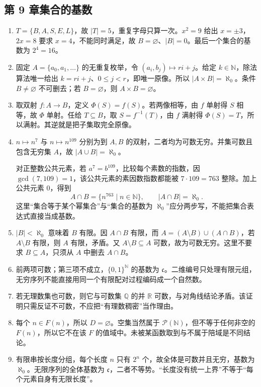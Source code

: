 \documentclass[UTF8,fontset=none,zihao=-4,a4paper]{ctexart}
\begin{document}
\subsection*{第 9 章\quad 集合的基数}
\begin{enumerate}[label=9.\arabic*.,leftmargin=2.8em]
\item $T=\{B,A,S,E,L\}$，故 $|T|=5$，重复字母只算一次。$x^2=9$ 给出 $x=\pm3$，$2x=8$ 要求 $x=4$，不能同时满足，故 $B=\varnothing$、$|B|=0$。最后一个集合的基数为 $2^4=16$。

\item 固定 $A=\{a_0,a_1,\ldots\}$ 的无重复枚举，令 $(a_i,b_j)\mapsto ri+j$。给定 $k\in\mathbb N$，除法算法唯一给出 $k=ri+j$、$0\le j<r$，即唯一原像。所以 $|A\times B|=\aleph_0$。条件 $B\ne\varnothing$ 不可删去；若 $B=\varnothing$，则 $A\times B=\varnothing$。

\item 取双射 $f:A\to B$，定义 $\Phi(S)=f(S)$。若两像相等，由 $f$ 单射得 $S$ 相等，故 $\Phi$ 单射。任给 $T\subseteq B$，取 $S=f^{-1}(T)$，由 $f$ 满射得 $\Phi(S)=T$，所以满射。其逆就是把子集取完全原像。

\item $n\mapsto n^7$ 与 $n\mapsto n^{109}$ 分别为到 $A,B$ 的双射，二者均为可数无穷。并集可数且包含无穷集 $A$，故 $|A\cup B|=\aleph_0$。

对正整数公共元素，若 $a^7=b^{109}$，比较每个素数的指数，因 $\gcd(7,109)=1$，该公共元素的素因数指数都能被 $7\cdot109=763$ 整除。加上公共元素 $0$，得到
\[
A\cap B=\{n^{763}\mid n\in\mathbb N\},\qquad |A\cap B|=\aleph_0.
\]
这里“集合等于某个幂集合”与“集合的基数为 $\aleph_0$”应分两步写，不能把集合表达式直接当成基数。

\item $|B|<\aleph_0$ 意味着 $B$ 有限。因 $A\cap B$ 有限，而 $A=(A\setminus B)\cup(A\cap B)$，若 $A\setminus B$ 有限，则 $A$ 有限，矛盾。又 $A\setminus B\subseteq A$ 可数，故为可数无穷。这里不要求 $B\subseteq A$，只须从 $A$ 中删去 $A\cap B$。

\item 前两项可数；第三项不成立，$\{0,1\}^{\mathbb N}$ 的基数为 $\mathfrak c$。二维编号只处理有限元组，无穷序列不能直接用同一个有限配对过程编码成一个自然数。

\item 若无理数集也可数，则它与可数集 $\mathbb Q$ 的并 $\mathbb R$ 可数，与对角线结论矛盾。该证明只需反证不可数，不应把“有理数稠密”当作理由。

\item 每个 $n\in F(n)$，所以 $D=\varnothing$。空集当然属于 $\mathcal P(\mathbb N)$，但不等于任何非空的 $F(n)$，所以它不在该 $F$ 的值域中。未被某函数取到与不属于陪域是不同结论。

\item 有限串按长度分组，每个长度 $n$ 只有 $2^n$ 个，故全体是可数并且无穷，基数为 $\aleph_0$。无限序列的全体基数为 $\mathfrak c$，二者不等势。“长度没有统一上界”不等于“每个元素自身有无限长度”。
\end{enumerate}
\end{document}
